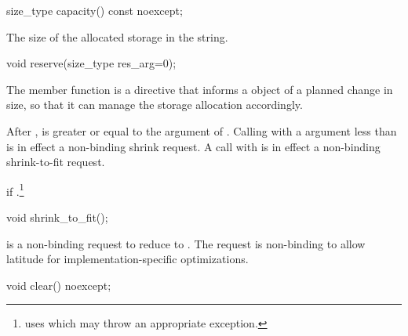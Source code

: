 %
%
\begin{itemdecl}
size_type capacity() const noexcept;
\end{itemdecl}

\begin{itemdescr}
\pnum
\returns
The size of the allocated storage in the string.
\end{itemdescr}

%
%
\begin{itemdecl}
void reserve(size_type res_arg=0);
\end{itemdecl}

\begin{itemdescr}
\pnum
The member function
is a directive that informs a
object of a planned change in size,
so that it can manage the storage allocation accordingly.

\pnum
\effects
After
,
is greater or equal to the argument of
.
\enternote
Calling
with a  argument less than
is in effect a non-binding shrink request.
A call with
is in effect a non-binding shrink-to-fit request.
\exitnote

\pnum
\throws
{}
if
.\footnote{
uses
which may throw an appropriate exception.}
\end{itemdescr}

%
%
\begin{itemdecl}
void shrink_to_fit();
\end{itemdecl}

\begin{itemdescr}
\pnum
\notes {} is a non-binding request to reduce
 to . \enternote The request is non-binding to
allow latitude for implementation-specific optimizations. \exitnote
\end{itemdescr}

%
%
\begin{itemdecl}
void clear() noexcept;
\end{itemdecl}

